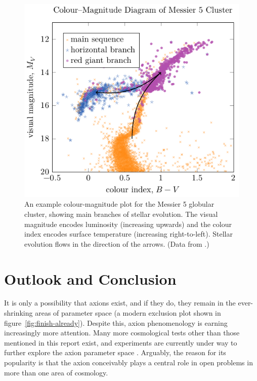 \begin{figure}
	\centering
	\includegraphics{diagrams/globular-cluster.pdf}
	\caption{An example colour-magnitude plot for the Messier 5 globular cluster, showing main branches of stellar evolution.
	The visual magnitude encodes luminosity (increasing upwards) and the colour index encodes surface temperature (increasing right-to-left).
	Stellar evolution flows in the direction of the arrows.
	(Data from \cite{M5_CM_diagram}.)
	}
	\label{fig:globular-cluster}
\end{figure}






\section{Outlook and Conclusion}

It is only a possibility that axions exist, and if they do, they remain in the ever-shrinking areas of parameter space (a modern exclusion plot shown in figure~\ref{fig:finish-already}).
Despite this, axion phenomenology is earning increasingly more attention.
Many more cosmological tests other than those mentioned in this report exist, and experiments are currently under way to further explore the axion parameter space \cite{Irastorza_2018,landscape_2020,further-lab-experiments_2017}.
Arguably, the reason for its popularity is that the axion conceivably plays a central role in open problems in more than one area of cosmology.


